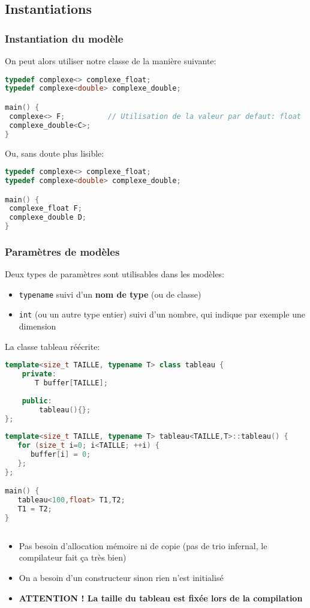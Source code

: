 \documentclass{beamer}
\begin{document}
\subsection{Instantiations}

\begin{frame}[fragile=singleslide,shrink=20]
\frametitle {Instantiation du modèle}

On peut alors utiliser notre classe de la manière suivante:
\begin{lstlisting}[language=c++]
typedef complexe<> complexe_float;
typedef complexe<double> complexe_double;

main() {
 complexe<> F;          // Utilisation de la valeur par defaut: float
 complexe_double<C>;    
}
\end{lstlisting}

Ou, sans doute plus lisible:
\begin{lstlisting}[language=c++]
typedef complexe<> complexe_float;
typedef complexe<double> complexe_double;

main() {
 complexe_float F;
 complexe_double D;
}
\end{lstlisting}
\end{frame}

\begin{frame}[fragile=singleslide,shrink=20]
\frametitle {Paramètres de modèles}

Deux types de paramètres sont utilisables dans les modèles:

\begin{itemize}
\item{\texttt{typename} suivi d'un \textbf{nom de type} (ou de classe) }
\item{\texttt{int} (ou un autre type entier) suivi d'un nombre, qui indique par exemple une dimension}
\end{itemize}

La classe tableau réécrite:
\begin{lstlisting}[language=c++]
template<size_t TAILLE, typename T> class tableau {
    private:
       T buffer[TAILLE];
    
    public:
        tableau(){};
};
    
template<size_t TAILLE, typename T> tableau<TAILLE,T>::tableau() {
   for (size_t i=0; i<TAILLE; ++i) { 
      buffer[i] = 0; 
   };
};

main() {
   tableau<100,float> T1,T2;
   T1 = T2;
}
   
\end{lstlisting}

\begin{itemize}
\item{Pas besoin d'allocation mémoire ni de copie (pas de trio infernal, le compilateur fait ça très bien)}
\item{On a besoin d'un constructeur sinon rien n'est initialisé}
\item{\textbf{ATTENTION ! La taille du tableau est fixée lors de la compilation}}
\end{itemize}
\end{frame}
\end{document}
